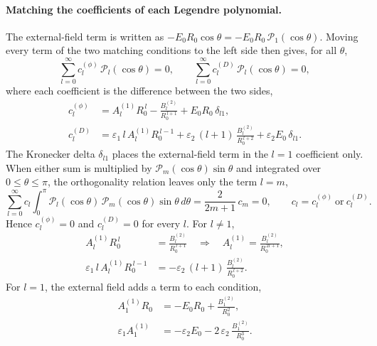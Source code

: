 \paragraph{Matching the coefficients of each Legendre polynomial.}
The external-field term is written as $-E_0R_0\cos\theta = -E_0R_0\,\mathcal{P}_1(\cos\theta)$. Moving every term of the two matching conditions to the left side then gives, for all $\theta$,
\begin{equation*}
    \sum_{l=0}^{\infty} c_l^{(\phi)}\,\mathcal{P}_l(\cos\theta) = 0,
    \qquad
    \sum_{l=0}^{\infty} c_l^{(D)}\,\mathcal{P}_l(\cos\theta) = 0,
\end{equation*}
where each coefficient is the difference between the two sides,
\begin{align*}
    c_l^{(\phi)} &= A_l^{(1)} R_0^{\,l} - \frac{B_l^{(2)}}{R_0^{\,l+1}} + E_0R_0\,\delta_{l1},\\
    c_l^{(D)} &= \varepsilon_1\, l\, A_l^{(1)} R_0^{\,l-1} + \varepsilon_2\,(l+1)\,\frac{B_l^{(2)}}{R_0^{\,l+2}} + \varepsilon_2 E_0\,\delta_{l1}.
\end{align*}
The Kronecker delta $\delta_{l1}$ places the external-field term in the $l = 1$ coefficient only. When either sum is multiplied by $\mathcal{P}_m(\cos\theta)\sin\theta$ and integrated over $0 \le \theta \le \pi$, the orthogonality relation leaves only the term $l = m$,
\begin{equation*}
    \sum_{l=0}^{\infty} c_l \int_0^\pi \mathcal{P}_l(\cos\theta)\,\mathcal{P}_m(\cos\theta)\sin\theta\,d\theta
    = \frac{2}{2m+1}\,c_m = 0,
    \qquad c_l = c_l^{(\phi)}\ \text{or}\ c_l^{(D)}.
\end{equation*}
Hence $c_l^{(\phi)} = 0$ and $c_l^{(D)} = 0$ for every $l$. For $l \neq 1$,
\begin{align*}
    A_l^{(1)} R_0^{\,l} &= \frac{B_l^{(2)}}{R_0^{\,l+1}}
    \quad\Rightarrow\quad A_l^{(1)} = \frac{B_l^{(2)}}{R_0^{\,2l+1}},\\
    \varepsilon_1\, l\, A_l^{(1)} R_0^{\,l-1} &= -\varepsilon_2\,(l+1)\,\frac{B_l^{(2)}}{R_0^{\,l+2}}.
\end{align*}
For $l = 1$, the external field adds a term to each condition,
\begin{align*}
    A_1^{(1)} R_0 &= -E_0 R_0 + \frac{B_1^{(2)}}{R_0^{2}},\\
    \varepsilon_1 A_1^{(1)} &= -\varepsilon_2 E_0 - 2\,\varepsilon_2\,\frac{B_1^{(2)}}{R_0^{3}}.
\end{align*}

